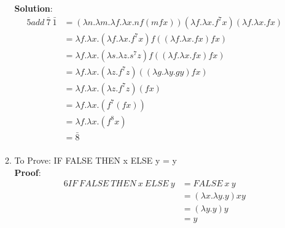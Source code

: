 \documentclass[11pt]{article}
\begin{document}
\begin{enumerate}
\begin{enumerate}
          \textbf{Solution}:  \begin{alignat*}{5}
                add\:\bar{7}\:\bar{1}  &= (\lambda n.\lambda m.\lambda f.\lambda x. n f (m f x))(\lambda f.\lambda x. f^7 x)(\lambda f.\lambda x. f x)\\
              &= \lambda f.\lambda x. (\lambda f.\lambda x. f^7 x) f ((\lambda f.\lambda x. f x)f x)\\
            &= \lambda f.\lambda x. (\lambda s.\lambda z. s^7 z) f ((\lambda f.\lambda x. f x)f x)\\
            &= \lambda f.\lambda x. (\lambda z. f^7 z)((\lambda g.\lambda y. g y)f x)\\
            &= \lambda f.\lambda x. (\lambda z. f^7 z)(f x)\\
            &= \lambda f.\lambda x. ( f^7 (f x))\\
            &= \lambda f.\lambda x. ( f^8 x)\\
                    &= \bar{8}\\
            \end{alignat*}
            
    \item To Prove: IF FALSE THEN x ELSE y = y\\
    \textbf{Proof}:  \begin{alignat*}{6}
    IF\:FALSE\:THEN\:x\:ELSE\:y &= FALSE\:x\:y  \\
    &= (\lambda x. \lambda y. y) x y\\
    &= ( \lambda y. y) y\\
    &= y\\
    \end{alignat*}
    

\end{enumerate}
\end{enumerate}
\end{document}
